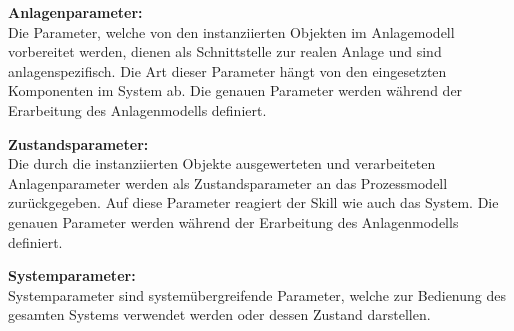 	\textbf{Anlagenparameter:}
	\vspace{2mm} 
	\\
	Die Parameter, welche von den instanziierten Objekten im Anlagemodell vorbereitet werden, dienen als Schnittstelle zur realen Anlage und sind anlagenspezifisch. Die Art dieser Parameter hängt von den eingesetzten Komponenten im System ab. Die genauen Parameter werden während der Erarbeitung des Anlagenmodells definiert.
	
	\textbf{Zustandsparameter:}
	\vspace{2mm} 
	\\
	Die durch die instanziierten Objekte ausgewerteten und verarbeiteten Anlagenparameter werden als Zustandsparameter an das Prozessmodell zurückgegeben. Auf diese Parameter reagiert der Skill wie auch das System. Die genauen Parameter werden während der Erarbeitung des Anlagenmodells definiert.
	
	\textbf{Systemparameter:}
	\vspace{2mm} 
	\\
	Systemparameter sind systemübergreifende Parameter, welche zur Bedienung des gesamten Systems verwendet werden oder dessen Zustand darstellen. 